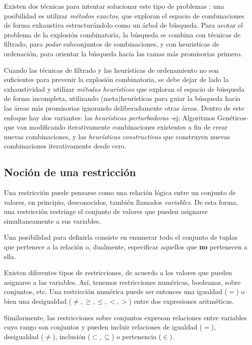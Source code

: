 \documentclass{llncs}
\begin{document}
   Existen dos técnicas para intentar solucionar este tipo de problemas \cite{sol}: una posibilidad es utilizar \textit{métodos exactos}, que exploran el espacio de combinaciones de forma exhaustiva estructurándolo como un árbol de búsqueda. Para acotar el problema de la
    explosión combinatoria, la búsqueda se combina con técnicas de filtrado, para
    \textit{podar} subconjuntos de combinaciones, y con heuristícas de ordenación, para orientar la búsqueda hacia las ramas más promisorias primero.
    
    Cuando las técnicas de filtrado y las heurísticas de ordenamiento no son suficientes para prevenir la explosión combinatoria, se debe dejar de lado la exhaustividad y utilizar \textit{métodos heurísticos} que exploran el espacio de búsqueda de forma incompleta, utilizando (meta)heurísticas para guiar la búsqueda hacia las áreas más promisorias ignorando deliberadamente otras áreas. Dentro de este enfoque hay dos variantes: las \textit{heurísticas perturbadoras} -ej: Algoritmos Genéticos- que van modificando iterativamente combinaciones existentes a fin de crear nuevas combinaciones, y las \textit{heurísticas constructivas} que construyen nuevas combinaciones iterativamente desde cero.
    
    \subsection{Noci\'on de una restricci\'on}
      Una restricci\'on puede pensarse como una relaci\'on l\'ogica entre un conjunto de valores, en principio,
      desconocidos, tambi\'en llamados \textit{variables}. De esta forma, una restricci\'on restringe el conjunto
      de valores que pueden asignarse simultaneamente a sus variables.
      
      Una posibilidad para definirla consiste en enumerar todo el conjunto de tuplas que pertenece a la relaci\'on o,
      dualmente, especificar aquellos que \textbf{no} pertenecen a ella.
      
      Existen diferentes tipos de restricciones, de acuerdo a los valores que pueden asignarse a las variables. As\'i,
      tenemos restricciones num\'ericas, booleanas, sobre conjuntos, etc. Una restricci\'on num\'erica puede ser entonces
      una igualdad ($=$) o bien una desigualdad ($\neq, \geq, \leq, <, >$) entre dos expresiones aritm\'eticas.
      
      Similarmente, las restricciones sobre conjuntos expresan relaciones entre variables cuyo rango son conjuntos y pueden
      incluir relaciones de igualdad ($=$), desigualdad ($\neq$), inclusi\'on ($\subset, \subseteq$) o pertenencia ($\in$).
      
\end{document}
